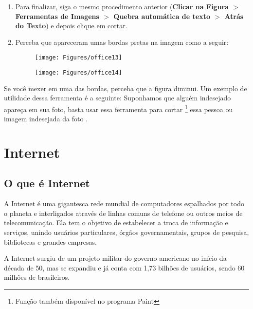 \documentclass[12pt]{article}
\begin{document}
\begin{enumerate}
			\item Para finalizar, siga o mesmo procedimento anterior (\textbf{Clicar na Figura $>$ Ferramentas de Imagens $>$ Quebra automática de texto $>$ Atrás do Texto}) e depois clique em cortar.
			
			\newpage
			
			\item  Perceba que apareceram umas bordas pretas na imagem como a seguir:
			\begin{figure}[!htbp]
				\centering
				\begin{minipage}[b]{0.9\textwidth}
					\texttt{[image: Figures/office13]}
					
				\end{minipage}
				\hfill
				\begin{minipage}[b]{0.9\textwidth}
					\texttt{[image: Figures/office14]}
					
				\end{minipage}
			\end{figure}
			
			
		\end{enumerate}
		
		Se você mexer em uma das bordas, perceba que a figura diminui. Um exemplo de utilidade dessa ferramenta é a seguinte: Suponhamos que alguém indesejado apareça em sua foto, basta usar essa ferramenta para cortar \footnote{Função também disponível no programa Paint} essa pessoa ou imagem indesejada da foto .
		
		\section{Internet}
		
		\subsection{O que é Internet}
		
		A Internet é uma gigantesca rede mundial de computadores espalhados por todo o planeta e interligados através de linhas comuns de telefone ou outros meios de telecomunicação. Ela tem o objetivo de estabelecer a troca de informação e serviços, unindo usuários particulares, órgãos governamentais, grupos de pesquisa, bibliotecas e grandes empresas. 

		A Internet surgiu de um projeto militar do governo americano no início da década de 50, mas se expandiu e já conta com 1,73 bilhões de usuários, sendo 60 milhões de brasileiros.
		
\end{document}

